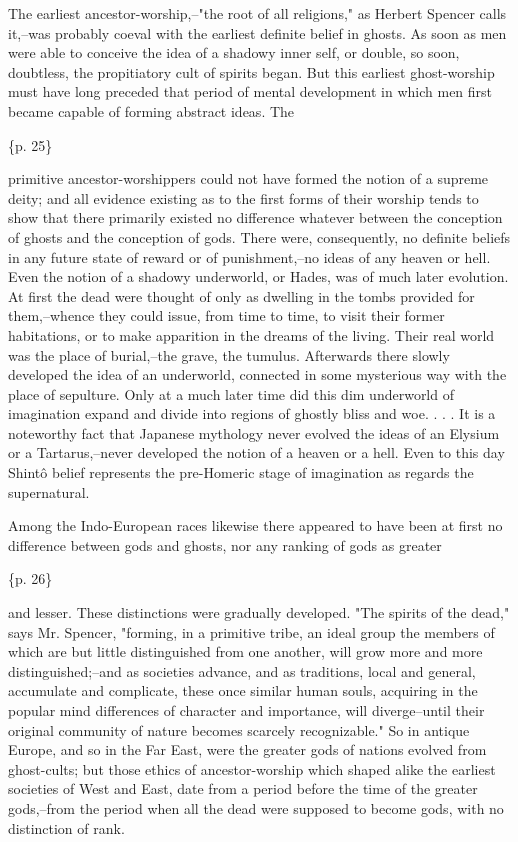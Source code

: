 The earliest ancestor-worship,--"the root of all religions," as Herbert Spencer calls it,--was probably coeval with the earliest definite belief in ghosts. As soon as men were able to conceive the idea of a shadowy inner self, or double, so soon, doubtless, the propitiatory cult of spirits began. But this earliest ghost-worship must have long preceded that period of mental development in which men first became capable of forming abstract ideas. The

\{p. 25\}

primitive ancestor-worshippers could not have formed the notion of a supreme deity; and all evidence existing as to the first forms of their worship tends to show that there primarily existed no difference whatever between the conception of ghosts and the conception of gods. There were, consequently, no definite beliefs in any future state of reward or of punishment,--no ideas of any heaven or hell. Even the notion of a shadowy underworld, or Hades, was of much later evolution. At first the dead were thought of only as dwelling in the tombs provided for them,--whence they could issue, from time to time, to visit their former habitations, or to make apparition in the dreams of the living. Their real world was the place of burial,--the grave, the tumulus. Afterwards there slowly developed the idea of an underworld, connected in some mysterious way with the place of sepulture. Only at a much later time did this dim underworld of imagination expand and divide into regions of ghostly bliss and woe. . . . It is a noteworthy fact that Japanese mythology never evolved the ideas of an Elysium or a Tartarus,--never developed the notion of a heaven or a hell. Even to this day Shintô belief represents the pre-Homeric stage of imagination as regards the supernatural.

Among the Indo-European races likewise there appeared to have been at first no difference between gods and ghosts, nor any ranking of gods as greater

\{p. 26\}

and lesser. These distinctions were gradually developed. "The spirits of the dead," says Mr. Spencer, "forming, in a primitive tribe, an ideal group the members of which are but little distinguished from one another, will grow more and more distinguished;--and as societies advance, and as traditions, local and general, accumulate and complicate, these once similar human souls, acquiring in the popular mind differences of character and importance, will diverge--until their original community of nature becomes scarcely recognizable." So in antique Europe, and so in the Far East, were the greater gods of nations evolved from ghost-cults; but those ethics of ancestor-worship which shaped alike the earliest societies of West and East, date from a period before the time of the greater gods,--from the period when all the dead were supposed to become gods, with no distinction of rank.

